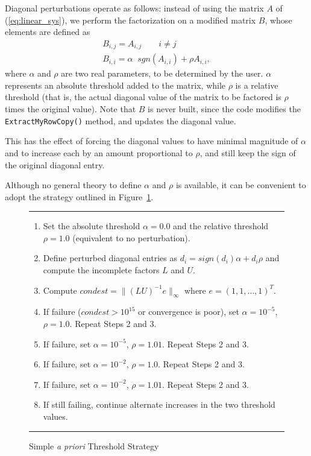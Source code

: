 Diagonal perturbations operate as follows:
instead of using the matrix $A$ of (\ref{eq:linear_sys}), we perform the factorization  on 
a modified matrix $B$, whose elements are defined as
\begin{equation}
\label{eq:B}
\begin{array}{lcr}
B_{i,j} = A_{i,j} \quad \quad i \neq j \\
B_{i,i} = \alpha \; \; sgn(A_{i,i}) + \rho A_{i,i},
  \end{array}
\end{equation}
where $\alpha$ and $\rho$ are two real parameters, to be determined by the
user. $\alpha$ represents an absolute threshold added to the matrix, while
$\rho$ is a relative threshold (that is, the actual diagonal value of the
matrix to be factored is $\rho$ times the original value).  Note that $B$ is
never built, since the code modifies
  the {\tt ExtractMyRowCopy()} method, and updates the diagonal value.


This has the
effect of forcing the diagonal values to have minimal magnitude of $\alpha$
and to increase each by an amount proportional to $\rho$, and still keep the
sign of the original diagonal entry.

Although no general theory to define $\alpha$ and $\rho$ is available, 
it can be convenient to adopt the strategy
outlined in Figure~\ref{f:aprioristrategy}.
\begin{figure}
\vspace{.05in}
\hrule
\vspace{.1in}
\begin{enumerate}
\item Set the absolute threshold $\alpha = 0.0$ and the relative
threshold $\rho = 1.0$ (equivalent to no perturbation).
\item Define perturbed diagonal entries as $d_{i} = sign(d_i)\alpha +
d_i\rho$ and compute the incomplete factors $L$ and $U$.
\item Compute $condest = \|(LU)^{-1}e\|_\infty$ where $e = (1, 1,
\ldots, 1)^T$.
\item If failure ($condest > 10^{15}$ or convergence is poor), set $\alpha =
10^{-5}$, $\rho = 1.0$.  Repeat Steps 2 and 3.
\item If failure, set $\alpha =
10^{-5}$, $\rho = 1.01$. Repeat Steps 2 and 3.
\item If failure, set $\alpha =
10^{-2}$, $\rho = 1.0$. Repeat Steps 2 and 3.
\item If failure, set $\alpha =
10^{-2}$, $\rho = 1.01$. Repeat Steps 2 and 3.
\item If still failing, continue alternate increases in
   the two threshold values.
\end{enumerate}
\vspace{.1in}
\hrule
\caption{Simple {\it a priori} Threshold Strategy}
\label{f:aprioristrategy}
\end{figure}

